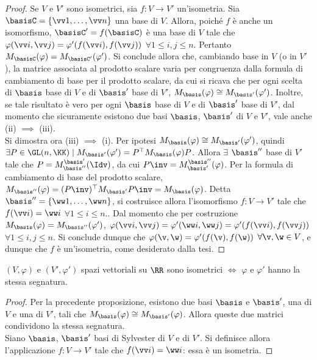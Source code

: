 \documentclass[11pt]{article}
\begin{document}
	\begin{proof} Se $V$ e $V'$ sono isometrici, sia $f : V \to V'$ un'isometria. Sia $\basisC = \{ \vv 1, \ldots, \vv n \}$ una base di $V$. Allora, poiché $f$ è anche un isomorfismo, $\basisC' = f(\basisC)$ è una base di $V$ tale che
		$\varphi(\vv i, \vv j) = \varphi'(f(\vv i), f(\vv j))$ $\forall 1 \leq i, j \leq n$. Pertanto $M_\basisC(\varphi) = M_{\basisC'}(\varphi')$. Si conclude allora che, cambiando base in $V$ (o in $V'$), la matrice associata
		al prodotto scalare varia per congruenza dalla formula di cambiamento di base per il prodotto scalare, da cui si ricava che per ogni scelta di $\basis$ base di $V$ e di $\basis'$ base di $V'$, $M_\basis(\varphi) \cong M_{\basis'}(\varphi')$. Inoltre, se tale risultato è vero per ogni $\basis$ base di $V$ e di $\basis'$ base di $V'$, dal momento che sicuramente esistono due basi $\basis$, $\basis'$ di $V$ e $V'$, vale anche (ii) $\implies$ (iii). \\
		
		Si dimostra ora (iii) $\implies$ (i). Per ipotesi $M_\basis(\varphi) \cong M_{\basis'}(\varphi')$, quindi
		$\exists P \in \GL(n, \KK) \mid M_{\basis'}(\varphi') = P^\top M_\basis(\varphi) P$. Allora $\exists$ $\basis''$
		base di $V'$ tale che $P = M_{\basis''}^{\basis'}(\Idv)$, da cui $P\inv = M_{\basis'}^{\basis''}(\varphi)$. Per la formula di cambiamento di base del prodotto
		scalare, $M_{\basis''}(\varphi) = (P\inv)^\top M_{\basis'} P\inv = M_\basis(\varphi)$. Detta
		$\basis'' = \{ \ww 1, \ldots, \ww n \}$, si costruisce allora l'isomorfismo $f : V \to V'$ tale
		che $f(\vv i) = \ww i$ $\forall 1 \leq i \leq n$.. Dal momento che per costruzione $M_\basis(\varphi) = M_{\basis''}(\varphi')$,
		$\varphi(\vv i, \vv j) = \varphi'(\ww i, \ww j) = \varphi'(f(\vv i), f(\vv j))$ $\forall 1 \leq i, j \leq n$.
		Si conclude dunque che $\varphi(\v, \w) = \varphi'(f(\v), f(\w))$ $\forall \v, \w \in V$, e dunque
		che $f$ è un'isometria, come desiderato dalla tesi. 
	\end{proof}

	\begin{proposition} $(V, \varphi)$ e $(V', \varphi')$ spazi vettoriali
		su $\RR$ sono
		isometrici $\iff$ $\varphi$ e $\varphi'$ hanno la stessa segnatura.
	\end{proposition}

	\begin{proof}\nl\nl
		\rightproof Per la precedente proposizione, esistono due basi $\basis$ e $\basis'$, una di $V$ e una di $V'$,
		tali che $M_\basis(\varphi) \cong M_{\basis'}(\varphi)$. Allora queste due matrici condividono la stessa
		segnatura. \\

		\leftproof Siano $\basis$, $\basis'$ basi di Sylvester di $V$
		e di $V'$. Si definisce allora l'applicazione $f : V \to V'$ tale
		che $f(\vv i) = \ww i$: essa è un isometria.
	\end{proof}
\end{document}
